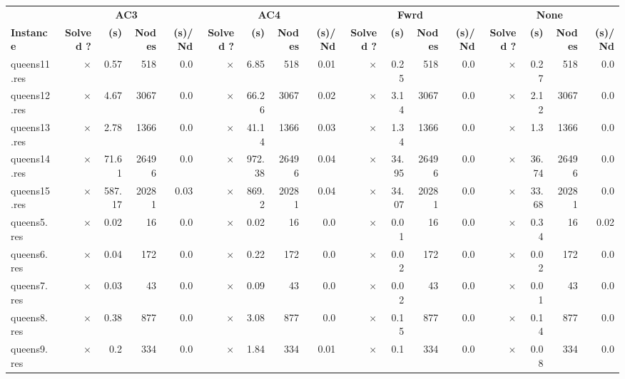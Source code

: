 \documentclass[main.tex]{subfiles}
\begin{document}
\begin{landscape}
\begin{center}
\renewcommand{\arraystretch}{1.4} 
\begin{tabular}{l
rrrrrrrrrrrrrrrr}
	\hline
 & \multicolumn{4}{c}{\textbf{AC3}} & \multicolumn{4}{c}{\textbf{AC4}} & \multicolumn{4}{c}{\textbf{Fwrd}} & \multicolumn{4}{c}{\textbf{None}}\\
\textbf{Instance}  & \textbf{Solved ?} & \textbf{(s)} & \textbf{Nodes} & \textbf{(s)/Nd} & \textbf{Solved ?} & \textbf{(s)} & \textbf{Nodes} & \textbf{(s)/Nd} & \textbf{Solved ?} & \textbf{(s)} & \textbf{Nodes} & \textbf{(s)/Nd} & \textbf{Solved ?} & \textbf{(s)} & \textbf{Nodes} & \textbf{(s)/Nd}\\\hline

queens11.res & 
$\times$
 & 0.57 & 518 & 0.0
 & 
$\times$
 & 6.85 & 518 & 0.01
 & 
$\times$
 & 0.25 & 518 & 0.0
 & 
$\times$
 & 0.27 & 518 & 0.0
\\
queens12.res & 
$\times$
 & 4.67 & 3067 & 0.0
 & 
$\times$
 & 66.26 & 3067 & 0.02
 & 
$\times$
 & 3.14 & 3067 & 0.0
 & 
$\times$
 & 2.12 & 3067 & 0.0
\\
queens13.res & 
$\times$
 & 2.78 & 1366 & 0.0
 & 
$\times$
 & 41.14 & 1366 & 0.03
 & 
$\times$
 & 1.34 & 1366 & 0.0
 & 
$\times$
 & 1.3 & 1366 & 0.0
\\
queens14.res & 
$\times$
 & 71.61 & 26496 & 0.0
 & 
$\times$
 & 972.38 & 26496 & 0.04
 & 
$\times$
 & 34.95 & 26496 & 0.0
 & 
$\times$
 & 36.74 & 26496 & 0.0
\\
queens15.res & 
$\times$
 & 587.17 & 20281 & 0.03
 & 
$\times$
 & 869.2 & 20281 & 0.04
 & 
$\times$
 & 34.07 & 20281 & 0.0
 & 
$\times$
 & 33.68 & 20281 & 0.0
\\
queens5.res & 
$\times$
 & 0.02 & 16 & 0.0
 & 
$\times$
 & 0.02 & 16 & 0.0
 & 
$\times$
 & 0.01 & 16 & 0.0
 & 
$\times$
 & 0.34 & 16 & 0.02
\\
queens6.res & 
$\times$
 & 0.04 & 172 & 0.0
 & 
$\times$
 & 0.22 & 172 & 0.0
 & 
$\times$
 & 0.02 & 172 & 0.0
 & 
$\times$
 & 0.02 & 172 & 0.0
\\
queens7.res & 
$\times$
 & 0.03 & 43 & 0.0
 & 
$\times$
 & 0.09 & 43 & 0.0
 & 
$\times$
 & 0.02 & 43 & 0.0
 & 
$\times$
 & 0.01 & 43 & 0.0
\\
queens8.res & 
$\times$
 & 0.38 & 877 & 0.0
 & 
$\times$
 & 3.08 & 877 & 0.0
 & 
$\times$
 & 0.15 & 877 & 0.0
 & 
$\times$
 & 0.14 & 877 & 0.0
\\
queens9.res & 
$\times$
 & 0.2 & 334 & 0.0
 & 
$\times$
 & 1.84 & 334 & 0.01
 & 
$\times$
 & 0.1 & 334 & 0.0
 & 
$\times$
 & 0.08 & 334 & 0.0
\\
\hline\end{tabular}
\end{center}
\end{landscape}
\end{document}
